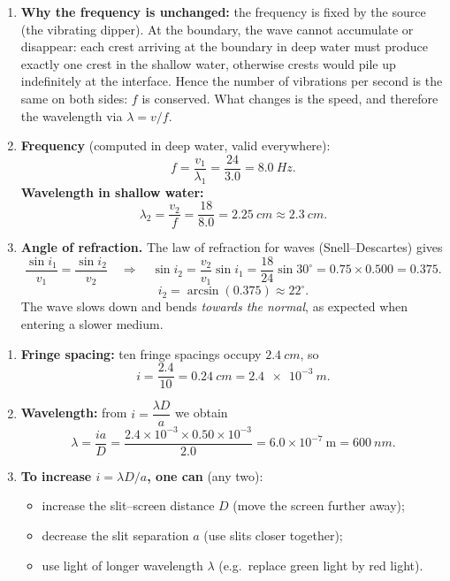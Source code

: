 \documentclass[11pt]{article}
\begin{document}
\begin{corrige}
\begin{enumerate}
\item \textbf{Why the frequency is unchanged:} the frequency is fixed by the source (the vibrating dipper). At the boundary, the wave cannot accumulate or disappear: each crest arriving at the boundary in deep water must produce exactly one crest in the shallow water, otherwise crests would pile up indefinitely at the interface. Hence the number of vibrations per second is the same on both sides: $f$ is conserved. What changes is the speed, and therefore the wavelength via $\lambda = v/f$.
\item \textbf{Frequency} (computed in deep water, valid everywhere):
\[ f = \frac{v_1}{\lambda_1} = \frac{24}{3.0} = \SI{8.0}{Hz}. \]
\textbf{Wavelength in shallow water:}
\[ \lambda_2 = \frac{v_2}{f} = \frac{18}{8.0} = \SI{2.25}{cm} \approx \SI{2.3}{cm}. \]
\item \textbf{Angle of refraction.} The law of refraction for waves (Snell--Descartes) gives
\[ \frac{\sin i_1}{v_1} = \frac{\sin i_2}{v_2}
\quad\Longrightarrow\quad
\sin i_2 = \frac{v_2}{v_1}\sin i_1 = \frac{18}{24}\sin 30^\circ = 0.75 \times 0.500 = 0.375. \]
\[ i_2 = \arcsin(0.375) \approx 22^\circ. \]
The wave slows down and bends \emph{towards the normal}, as expected when entering a slower medium.
\end{enumerate}
\end{corrige}

\begin{corrige}
\begin{enumerate}
\item \textbf{Fringe spacing:} ten fringe spacings occupy $\SI{2.4}{cm}$, so
\[ i = \frac{2.4}{10} = \SI{0.24}{cm} = \SI{2.4e-3}{m}. \]
\item \textbf{Wavelength:} from $i = \dfrac{\lambda D}{a}$ we obtain
\[ \lambda = \frac{ia}{D} = \frac{2.4\times10^{-3}\times 0.50\times10^{-3}}{2.0}
= 6.0\times10^{-7}\ \mathrm{m} = \SI{600}{nm}. \]
\item \textbf{To increase $i = \lambda D/a$, one can} (any two):
\begin{itemize}
\item increase the slit--screen distance $D$ (move the screen further away);
\item decrease the slit separation $a$ (use slits closer together);
\item use light of longer wavelength $\lambda$ (e.g.\ replace green light by red light).
\end{itemize}
\end{enumerate}
\end{corrige}
\end{document}
